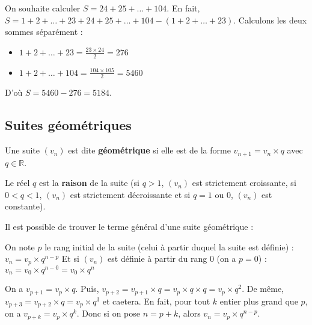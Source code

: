 	\begin{tip}[Exemple]
		On souhaite calculer $S = 24 + 25 + \dots + 104$.
		\newpar
		En fait, $S = 1 + 2 + \dots + 23 + 24 + 25 + \dots + 104 - (1 + 2 + \dots + 23)$. Calculons les deux sommes séparément :
		\begin{itemize}
			\item $1 + 2 + \dots + 23 = \displaystyle{\frac{23 \times 24}{2}} = 276$
			\item $1 + 2 + \dots + 104 = \displaystyle{\frac{104 \times 105}{2}} = 5460$
		\end{itemize}
		D'où $S = 5460 - 276 = 5184$.
	\end{tip}
	
	\subsection{Suites géométriques}
	
	\begin{formula}[Définition]
		Une suite $(v_n)$ est dite \textbf{géométrique} si elle est de la forme $v_{n+1} = v_n \times q$ avec $q \in \mathbb{R}$.
	\end{formula}
	
	\begin{formula}[Raison]
		Le réel $q$ est la \textbf{raison} de la suite (si $q > 1$, $(v_n)$ est strictement croissante, si $0 < q < 1$, $(v_n)$ est strictement décroissante et si $q = 1$ ou $0$, $(v_n)$ est constante).
	\end{formula}
	
	Il est possible de trouver le terme général d'une suite géométrique :
	
	\begin{formula}
		On note $p$ le rang initial de la suite (celui à partir duquel la suite est définie) :
		\newpar
		$v_n = v_p \times q^{n-p}$
		\newpar
		Et si $(v_n)$ est définie à partir du rang $0$ (on a $p = 0$) :
		\newpar
		$v_n = v_0 \times q^{n-0} = v_0 \times q^n$
	\end{formula}
	
	\begin{demonstration}
		On a $v_{p+1} = v_p \times q$. Puis, $v_{p+2} = v_{p+1} \times q = v_p \times q \times q = v_p \times q^2$. De même, $v_{p+3} = v_{p+2} \times q = v_p \times q^3$  et caetera.
		\newline
		En fait, pour tout $k$ entier plus grand que $p$, on a $v_{p+k} = v_p \times q^k$.
		\newline
		Donc si on pose $n = p+k$, alors $v_n = v_p \times q^{n-p}$.
	\end{demonstration}
	
